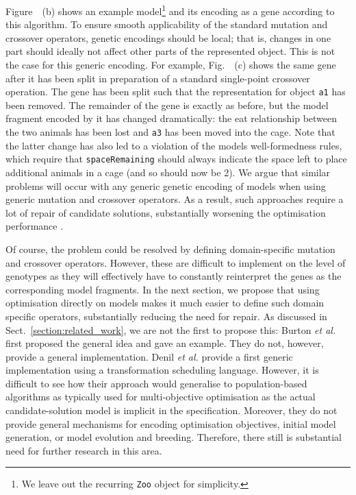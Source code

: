	
	Figure~~(b) shows an example model\footnote{We leave out the recurring \texttt{Zoo} object for simplicity.} and its encoding as a gene according to this algorithm. To ensure
	smooth applicability of the standard mutation and crossover operators, genetic encodings should be local; that is, changes in one part should ideally not affect other parts of the represented
	object. This is not the case for this generic encoding. For example, Fig.~~(c) shows the same gene after it has been split in preparation of a standard single-point crossover
	operation. The gene has been split such that the representation for object \texttt{a1} has been removed. The remainder of the gene is exactly as before, but the model fragment encoded by it has
	changed dramatically: the eat relationship between the two animals has been lost and \texttt{a3} has been moved into the cage. Note that the latter change has also led to a violation of the models
	well-formedness rules, which require that \texttt{spaceRemaining} should always indicate the space left to place additional animals in a cage (and so should now be 2). We argue that similar problems
	will occur with any generic genetic encoding of models when using generic mutation and crossover operators. As a result, such approaches require a lot of repair of candidate solutions, substantially
	worsening the optimisation performance \cite{Efstathiou+14b}.
	
	Of course, the problem could be resolved by defining domain-specific mutation and crossover operators. However, these are difficult to implement on the level of
	genotypes as they will effectively have to constantly reinterpret the genes as the corresponding model fragments. In the next section, we propose that using
	optimisation directly on models makes it much easier to define such domain specific operators, substantially reducing the need for repair. As discussed in 
	Sect.~\ref{section:related_work}, we are not the first to propose this: Burton \emph{et al.} \cite{Burton+12,BurtonPoulding13} first proposed the general idea
	and gave an example. They do not, however, provide a general implementation. Denil \emph{et al.} \cite{Denil+14} provide a first generic implementation using a
	transformation scheduling language. However, it is difficult to see how their approach would generalise to population-based algorithms as typically used for 
	multi-objective optimisation as the actual candidate-solution model is implicit in the specification. Moreover, they do not provide general mechanisms for
	encoding optimisation objectives, initial model generation, or model evolution and breeding. Therefore, there still is substantial need for further research in
	this area.